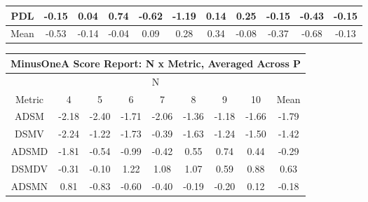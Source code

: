 \documentclass[11pt,a4paper]{report}
\begin{document}
\begin{longtable}{ | c || c | c | c | c | c | c | c | c | c || c |}
PDL &  \cellcolor[HTML]{FFFFFF} -0.15 &  \cellcolor[HTML]{FFFFFF} 0.04 &  \cellcolor[HTML]{EFEFFF} 0.74 &  \cellcolor[HTML]{FFEFEF} -0.62 &  \cellcolor[HTML]{FFDFDF} -1.19 &  \cellcolor[HTML]{FFFFFF} 0.14 &  \cellcolor[HTML]{F7F7FF} 0.25 &  \cellcolor[HTML]{FFFFFF} -0.15 &  \cellcolor[HTML]{FFF7F7} -0.43 &  \cellcolor[HTML]{FFFFFF} -0.15 \\
\hline
\hline
Mean  &  \cellcolor[HTML]{FFEFEF} -0.53 &  \cellcolor[HTML]{FFFFFF} -0.14 &  \cellcolor[HTML]{FFFFFF} -0.04 &  \cellcolor[HTML]{FFFFFF} 0.09 &  \cellcolor[HTML]{F7F7FF} 0.28 &  \cellcolor[HTML]{F7F7FF} 0.34 &  \cellcolor[HTML]{FFFFFF} -0.08 &  \cellcolor[HTML]{FFF7F7} -0.37 &  \cellcolor[HTML]{FFEFEF} -0.68 &  \cellcolor[HTML]{FFFFFF} -0.13 \\
\hline
\end{longtable}
\begin{longtable}{ | c || c | c | c | c | c | c | c || c |}
\hline
\multicolumn{9}{|c|}{ MinusOneA Score Report: N x Metric, Averaged Across P } \\
\hline
\multicolumn{9}{|c|}{ N } \\
\hline
Metric & 4 & 5 & 6 & 7 & 8 & 9 & 10 & Mean\\
\hline
\hline
\endhead
ADSM &  \cellcolor[HTML]{FFC7C7} -2.18 &  \cellcolor[HTML]{FFBFBF} -2.40 &  \cellcolor[HTML]{FFD7D7} -1.71 &  \cellcolor[HTML]{FFCFCF} -2.06 &  \cellcolor[HTML]{FFDFDF} -1.36 &  \cellcolor[HTML]{FFDFDF} -1.18 &  \cellcolor[HTML]{FFD7D7} -1.66 &  \cellcolor[HTML]{FFCFCF} -1.79 \\
DSMV &  \cellcolor[HTML]{FFC7C7} -2.24 &  \cellcolor[HTML]{FFDFDF} -1.22 &  \cellcolor[HTML]{FFD7D7} -1.73 &  \cellcolor[HTML]{FFF7F7} -0.39 &  \cellcolor[HTML]{FFD7D7} -1.63 &  \cellcolor[HTML]{FFDFDF} -1.24 &  \cellcolor[HTML]{FFD7D7} -1.50 &  \cellcolor[HTML]{FFDFDF} -1.42 \\
ADSMD &  \cellcolor[HTML]{FFCFCF} -1.81 &  \cellcolor[HTML]{FFEFEF} -0.54 &  \cellcolor[HTML]{FFE7E7} -0.99 &  \cellcolor[HTML]{FFF7F7} -0.42 &  \cellcolor[HTML]{EFEFFF} 0.55 &  \cellcolor[HTML]{EFEFFF} 0.74 &  \cellcolor[HTML]{F7F7FF} 0.44 &  \cellcolor[HTML]{FFF7F7} -0.29 \\
DSMDV &  \cellcolor[HTML]{FFF7F7} -0.31 &  \cellcolor[HTML]{FFFFFF} -0.10 &  \cellcolor[HTML]{DFDFFF} 1.22 &  \cellcolor[HTML]{E7E7FF} 1.08 &  \cellcolor[HTML]{E7E7FF} 1.07 &  \cellcolor[HTML]{EFEFFF} 0.59 &  \cellcolor[HTML]{E7E7FF} 0.88 &  \cellcolor[HTML]{EFEFFF} 0.63 \\
ADSMN &  \cellcolor[HTML]{E7E7FF} 0.81 &  \cellcolor[HTML]{FFE7E7} -0.83 &  \cellcolor[HTML]{FFEFEF} -0.60 &  \cellcolor[HTML]{FFF7F7} -0.40 &  \cellcolor[HTML]{FFF7F7} -0.19 &  \cellcolor[HTML]{FFF7F7} -0.20 &  \cellcolor[HTML]{FFFFFF} 0.12 &  \cellcolor[HTML]{FFF7F7} -0.18 \\

\end{longtable}
\end{document}
